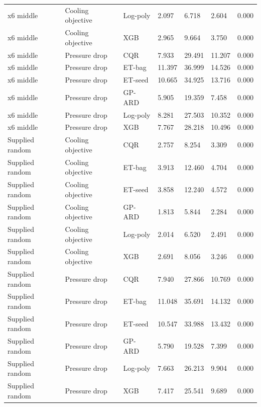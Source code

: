 \begin{longtable}{lllllll}
x6 middle & Cooling objective & Log-poly & 2.097 & 6.718 & 2.604 & 0.000\\
x6 middle & Cooling objective & XGB & 2.965 & 9.664 & 3.750 & 0.000\\
x6 middle & Pressure drop & CQR & 7.933 & 29.491 & 11.207 & 0.000\\
x6 middle & Pressure drop & ET-bag & 11.397 & 36.999 & 14.526 & 0.000\\
x6 middle & Pressure drop & ET-seed & 10.665 & 34.925 & 13.716 & 0.000\\
x6 middle & Pressure drop & GP-ARD & 5.905 & 19.359 & 7.458 & 0.000\\
x6 middle & Pressure drop & Log-poly & 8.281 & 27.503 & 10.352 & 0.000\\
x6 middle & Pressure drop & XGB & 7.767 & 28.218 & 10.496 & 0.000\\
Supplied random & Cooling objective & CQR & 2.757 & 8.254 & 3.309 & 0.000\\
Supplied random & Cooling objective & ET-bag & 3.913 & 12.460 & 4.704 & 0.000\\
Supplied random & Cooling objective & ET-seed & 3.858 & 12.240 & 4.572 & 0.000\\
Supplied random & Cooling objective & GP-ARD & 1.813 & 5.844 & 2.284 & 0.000\\
Supplied random & Cooling objective & Log-poly & 2.014 & 6.520 & 2.491 & 0.000\\
Supplied random & Cooling objective & XGB & 2.691 & 8.056 & 3.246 & 0.000\\
Supplied random & Pressure drop & CQR & 7.940 & 27.866 & 10.769 & 0.000\\
Supplied random & Pressure drop & ET-bag & 11.048 & 35.691 & 14.132 & 0.000\\
Supplied random & Pressure drop & ET-seed & 10.547 & 33.988 & 13.432 & 0.000\\
Supplied random & Pressure drop & GP-ARD & 5.790 & 19.528 & 7.399 & 0.000\\
Supplied random & Pressure drop & Log-poly & 7.663 & 26.213 & 9.904 & 0.000\\
Supplied random & Pressure drop & XGB & 7.417 & 25.541 & 9.689 & 0.000\\
\bottomrule\end{longtable}\endgroup
